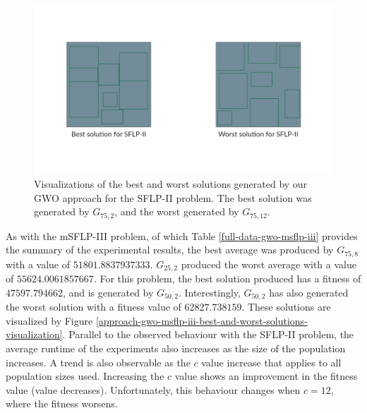 \begin{figure}[h!]
\centering
\begin{adjustwidth}{-0.45in}{}
	\includegraphics[scale=1.0]{./images/chap07-rd/gwo-sflp2-best-and-worst-solutions.png}
\end{adjustwidth}
\caption{Visualizations of the best and worst solutions generated by our GWO approach for the SFLP-II problem. The best solution was generated by $G_{75,2}$, and the worst generated by $G_{75,12}$.}
\label{approach-gwo-sflp-ii-best-and-worst-solutions-visualization}
\end{figure}

As with the mSFLP-III problem, of which Table \ref{full-data-gwo-msflp-iii} provides the summary of the experimental results, the best average was produced by $G_{75,8}$ with a value of $51801.8837937333$. $G_{25,2}$ produced the worst average with a value of $55624.0061857667$. For this problem, the best solution produced has a fitness of $47597.794662$, and is generated by $G_{50,2}$. Interestingly, $G_{50,2}$ has also generated the worst solution with a fitness value of $62827.738159$. These solutions are visualized by Figure \ref{approach-gwo-msflp-iii-best-and-worst-solutions-visualization}. Parallel to the observed behaviour with the SFLP-II problem, the average runtime of the experiments also increases as the size of the population increases. A trend is also observable as the $c$ value increase that applies to all population sizes used. Increasing the $c$ value shows an improvement in the fitness value (value decreases). Unfortunately, this behaviour changes when $c = 12$, where the fitness worsens.

